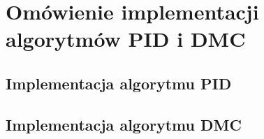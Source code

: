 \chapter{Omówienie implementacji algorytmów PID i DMC}
\label{zad4}

\section{Implementacja algorytmu PID}
\label{zad4_pid}


\section{Implementacja algorytmu DMC}
\label{zad4_dmc}